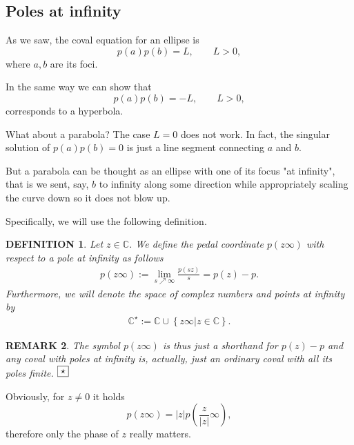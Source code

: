 \documentclass[10pt,a4paper,reqno]{amsart}
\newtheorem{defi}{\bf D\scriptsize EFINITION \normalsize}
\newtheorem{rem}[defi]{\bf R\scriptsize EMARK \normalsize}
\def\kopr{\hfill\raisebox{3pt}{\framebox{$\star$}}}
\newenvironment{remark}{\begin{rem}\rm}{$\kopr$\end{rem}}
\newenvironment{definition}{\begin{defi}\rm}{\end{defi}}
\newcommand{\zav}[1]{\left( #1 \right)}
\newcommand{\szav}[1]{\left\{ #1 \right\}}
\begin{document}
\subsection{Poles at infinity}
As we saw, the coval equation for an ellipse is
$$
p(a)p(b)=L,\qquad L>0,
$$
where $a,b$ are its foci.

In the same way we can show that
$$
p(a)p(b)=-L,\qquad L>0,
$$
corresponds to a hyperbola.

What about a parabola? The case $L=0$ does not work. In fact, the singular solution of $p(a)p(b)=0$ is just a line segment connecting $a$ and $b$.

But a parabola can be thought as an ellipse with one of its focus "at infinity", that is we sent, say, $b$ to infinity along some direction while appropriately scaling the curve down so it does not blow up.

Specifically, we will use the following definition.
\begin{definition} Let $z\in \mathbb{C}$. We define the pedal coordinate $p(z\infty)$ with respect to a pole \textit{at infinity} as follows 
\begin{align}
p\zav{z\infty}:=\lim_{s\nearrow \infty}\frac{p\zav{sz}}{s}=p\zav{z}-p.
\end{align}
Furthermore, we will denote the space of complex numbers and points at infinity by
\begin{align}
\mathbb{C}^\star:=\mathbb{C}\cup \szav{z\infty|z\in\mathbb{C}}.
\end{align}
\end{definition}
\begin{remark}
The symbol $p(z\infty)$ is thus just a shorthand for $p(z)-p$ and any coval with poles at infinity is, actually, just an ordinary coval with all its poles finite. 
\end{remark}
Obviously, for $z\not= 0$ it holds
$$
p(z\infty)=|z|p\zav{\frac{z}{|z|}\infty},
$$ 
therefore only the phase of $z$ really matters.
\end{document}
